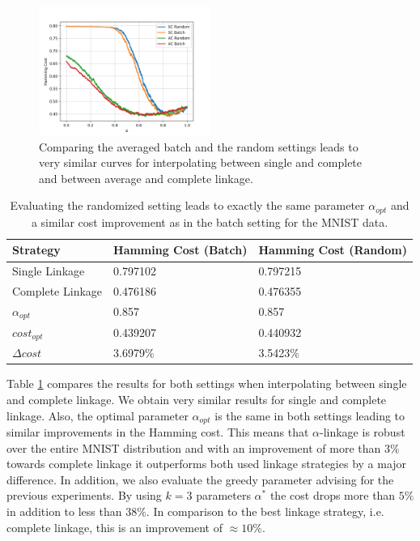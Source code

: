 \begin{figure}[h]
    \centering
    \includegraphics[width=0.5\textwidth]{plots/mnist_1000.png}
    \caption{Comparing the averaged batch and the random settings leads to very similar curves for interpolating between single and complete and between average and complete linkage.}
    \label{fig:mnistscrandom}
\end{figure}

\begin{table}[H]
    \centering
    \begin{tabular}{|l | l | l |}
    \hline
    Strategy & Hamming Cost (Batch) & Hamming Cost (Random)\\ \hline
    Single Linkage & 0.797102 & 0.797215\\
    Complete Linkage & 0.476186 & 0.476355\\
    $\alpha_{opt}$ & 0.857 & 0.857\\
    $cost_{opt}$ & 0.439207 & 0.440932\\
    $\Delta cost$ & 3.6979\% & 3.5423\%\\\hline
    \end{tabular}
    \caption{Evaluating the randomized setting leads to exactly the same parameter $\alpha_{opt}$ and a similar cost improvement as in the batch setting for the MNIST data.}
    \label{table:mnist1000randomsc}
\end{table}

Table \ref{table:mnist1000randomsc} compares the results for both settings when interpolating between single and complete linkage. We obtain very similar results for single and complete linkage. Also, the optimal parameter $\alpha_{opt}$ is the same in both settings leading to similar improvements in the Hamming cost. This means that $\alpha$-linkage is robust over the entire MNIST distribution and with an improvement of more than $3\%$ towards complete linkage it outperforms both used linkage strategies by a major difference. In addition, we also evaluate the greedy parameter advising for the previous experiments. By using $k = 3$ parameters $\alpha^*$ the cost drops more than $5\%$ in addition to less than $38\%$. In comparison to the best linkage strategy, i.e. complete linkage, this is an improvement of $\approx 10\%$.\\

